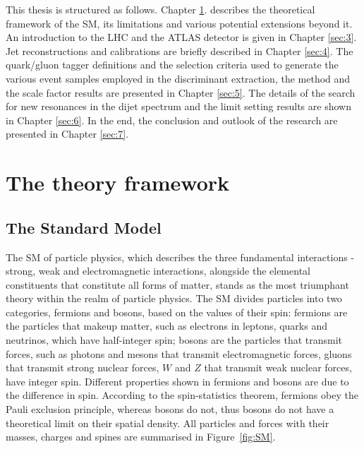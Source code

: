 \documentclass[UTF8,12pt]{ctexart}
\numberwithin{equation}{section}
\begin{document}
This thesis is structured as follows. Chapter \ref{sec:2}. describes the theoretical framework of the SM, its limitations and various potential extensions beyond it. An introduction to the LHC and the ATLAS detector is given in Chapter \ref{sec:3}. Jet reconstructions and calibrations are briefly described in Chapter \ref{sec:4}. The quark/gluon tagger definitions and the selection criteria used to generate the various event samples employed in the discriminant extraction, the method and the scale factor results are presented in Chapter \ref{sec:5}. The details of the search for new resonances in the dijet spectrum and the limit setting results are shown in Chapter \ref{sec:6}. In the end, the conclusion and outlook of the research are presented in Chapter \ref{sec:7}.




\newpage
{}
\section{The theory framework}
\label{sec:2}
\subsection{The Standard Model}
\label{sec:2.1}

The SM of particle physics, which describes the three fundamental interactions - strong, weak and electromagnetic interactions, alongside the elemental constituents that constitute all forms of matter, stands as the most triumphant theory within the realm of particle physics. 
The SM divides particles into two categories, fermions and bosons, based on the values of their spin: fermions are the particles that makeup matter, such as electrons in leptons, quarks and neutrinos, which have half-integer spin; bosons are the particles that transmit forces, such as photons and mesons that transmit electromagnetic forces, gluons that transmit strong nuclear forces, $W$ and $Z$ that transmit weak nuclear forces, have integer spin.  Different properties shown in fermions and bosons are due to the difference in spin. According to the spin-statistics theorem, fermions obey the Pauli exclusion principle, whereas bosons do not, thus bosons do not have a theoretical limit on their spatial density. All particles and forces with their masses, charges and spines are summarised in Figure~\ref{fig:SM}.
\end{document}
